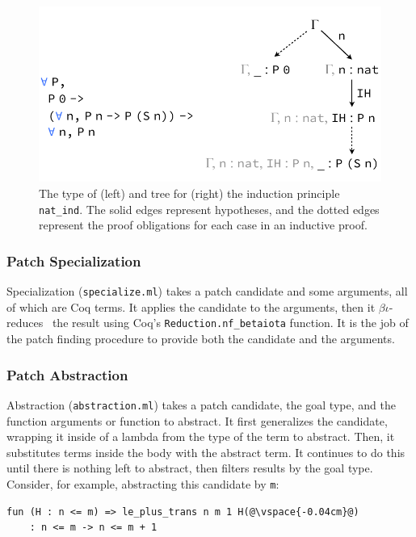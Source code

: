 \begin{figure}[t]
\begin{center}
\includegraphics[scale=0.55]{repair/nat_ind}
\end{center}
\vspace{-0.5cm}
\caption{The type of (left) and tree for (right) the induction principle \lstinline{nat_ind}. The solid edges represent hypotheses, and the dotted edges represent the proof obligations for each case in an inductive proof.}
\label{fig:cattree}
\end{figure}

\subsubsection{Patch Specialization} Specialization (\lstinline{specialize.ml}) takes a patch candidate and some arguments,
all of which are Coq terms.
It applies the candidate to the arguments, then it $\beta\iota$-reduces~\cite{equality} the result using Coq's
\lstinline{Reduction.nf_betaiota} function. It is the job of the 
patch finding procedure to provide both the candidate and the arguments.

\subsubsection{Patch Abstraction} Abstraction (\lstinline{abstraction.ml}) takes a patch candidate, 
the goal type, and the function arguments or function to abstract.
It first generalizes the candidate, wrapping it inside of a lambda from the type of the term to abstract.
Then, it substitutes terms inside the body with the abstract term.
It continues to do this until there is nothing left to abstract, then filters results by the goal type.
Consider, for example, abstracting this candidate by \lstinline{m}:

\begin{lstlisting}[language=coq]
    fun (H : n <= m) => le_plus_trans n m 1 H(@\vspace{-0.04cm}@)
    : n <= m -> n <= m + 1
\end{lstlisting}

